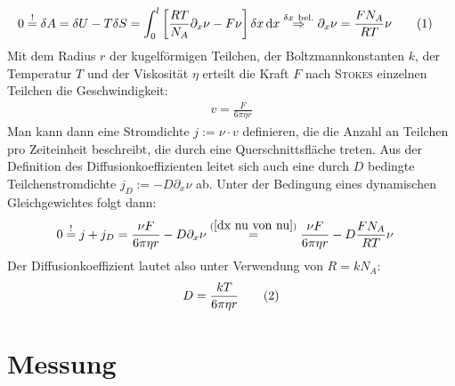 \documentclass[a4paper,12pt]{article}
\newcommand\numberthis{\addtocounter{equation}{1}\tag{\theequation}}
\newcommand{\intx}{}
\newcommand{\klam}{}
\begin{document}
\begin{align*}
0&\overset{!}{=}\delta A=\delta U-T\delta S=\intx\int_{0}^{l}\klam\left[ {\frac{RT}{N_A}\partial_x\nu-F\nu} \right]\delta x\,\mathrm{d}x\overset{\delta x\ \mathrm{bel.}}{\ \ \Rightarrow\ \ }\partial_x\nu=\frac{FN_A}{RT}\nu\numberthis\label{dx nu von nu}
\end{align*}
Mit dem Radius $r$ der kugelförmigen Teilchen, der Boltzmannkonstanten $k$, der Temperatur $T$ und der Viskosität $\eta$ erteilt die Kraft $F$ nach \textsc{Stokes} einzelnen Teilchen die Geschwindigkeit:
\begin{align*}
v=\frac{F}{6\pi\eta r}
\end{align*} 
Man kann dann eine Stromdichte $j:=\nu\cdot v$ definieren, die die Anzahl an Teilchen pro Zeiteinheit beschreibt, die durch eine Querschnittsfläche treten. Aus der Definition des Diffusionkoeffizienten leitet sich auch eine durch $D$ bedingte Teilchenstromdichte $j_D:=-D\partial_x\nu$ ab. Unter der Bedingung eines dynamischen Gleichgewichtes folgt dann:
\begin{align*}
0&\overset{!}{=}j+j_D=\frac{\nu F}{6\pi\eta r}-D\partial_x \nu\overset{(\ref{dx nu von nu})}{=}\frac{\nu F}{6\pi\eta r}-D\frac{FN_A}{RT}\nu
\end{align*}
Der Diffusionkoeffizient lautet also unter Verwendung von $R=kN_A$:
\begin{align*}
D=\frac{kT}{6\pi\eta r}\numberthis\label{D von r}
\end{align*} 
\section{Messung}
\end{document}
